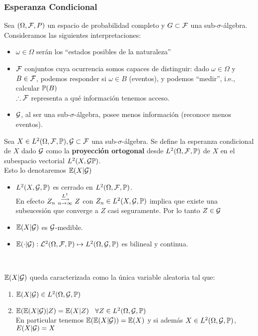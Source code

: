 \subsubsection{Esperanza Condicional} %
Sea $(\Omega,\F,P)$ un espacio de probabilidad completo y $G\subset \F$ una sub-$\sigma$-álgebra. Consideramos las siguientes interpretaciones:
\begin{itemize}
    \item $\omega\in\Omega$ serán los ``estados posibles de la naturaleza''
    \item $\F$ conjuntos cuya ocurrencia somos capaces de distinguir: dado $\omega \in\Omega$ y $B\in\F$, podemos responder si $\omega\in B$ (eventos), y podemos ``medir'', i.e., calcular $\P(B)$ \\
    $\therefore\F$ representa a qué información tenemos acceso.
    \item $\G$, al ser una sub-$\sigma$-álgebra, posee menos información (reconoce menos eventos).
\end{itemize}
\begin{definition}
Sea $X\in L^2\edp, \G\subset\F$ una sub-$\sigma$-álgebra. Se define la esperanza condicional de $X$ dado $\G$ como la \textbf{proyección ortogonal} desde $L^2\edp$ de $X$ en el subespacio vectorial $L^2(X,\G\P)$.
\\ Esto lo denotaremos $\E(X|\G)$
\end{definition}
\begin{remark}
\beforeitemize
\begin{itemize}
    \item $L^2(X,\G,\P)$ es cerrado en $L^2\edp$.
    \\ En efecto $Z_n\convldos Z$ con $Z_n\in L^2(X,\G,\P)$ implica que existe una subsucesión que converge a $Z$ casi seguramente. Por lo tanto $Z\in\G$
    \item $\E(X|\G)$ es $\G$-medible.
    \item $\E(\cdot|\G):\L^2\edp\mapsto L^2(\Omega,\G,\P)$ es bilineal y continua.
\end{itemize}
\end{remark}
\vspace{1cm} \\  %
\begin{remark}
$\E(X|\G)$ queda caracterizada como la única variable aleatoria tal que:
\begin{enumerate}
    \item $\E(X|\G)\in L^2(\Omega,\G,\P)$
    \item $\E(\E(X|\G)|Z) = \E(X|Z) \espacio \forall Z\in L^2(\Omega,\G,\P)$
    \vspace{.4cm}\\ En particular tenemos $\E(\E(X|\G)) = \E(X)$ y si además $X\in L^2(\Omega,\G,\P)$, $E(X|\G)=X$
\end{enumerate}
\end{remark}


